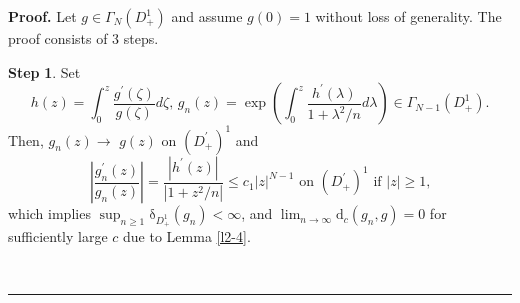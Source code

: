 \documentclass[a4paper]{article}%
\newenvironment{proof}[1][Proof]{\noindent\textbf{#1.} }{\ \rule{0.5em}{0.5em}}
\begin{document}
\begin{proof}
Let $g\in\Gamma_{N}\left(  D_{+}^{1}\right)  $ and assume $g(0)=1$ without
loss of generality. The proof consists of 3 steps.

\textbf{Step} \textbf{1}. Set%
\[
h\left(  z\right)  =%
{\displaystyle\int_{0}^{z}}
\dfrac{g^{\prime}\left(  \zeta\right)  }{g\left(  \zeta\right)  }d\zeta\text{,
\ }g_{n}\left(  z\right)  =\exp\left(  \int_{0}^{z}\dfrac{h^{\prime}\left(
\lambda\right)  }{1+\lambda^{2}/n}d\lambda\right)  \in\Gamma_{N-1}\left(
D_{+}^{1}\right)  \text{.}%
\]
Then, $g_{n}\left(  z\right)  \rightarrow$ $g\left(  z\right)  $ on $\left(
D_{+}^{\prime}\right)  ^{1}$ and%
\[
\left\vert \dfrac{g_{n}^{\prime}\left(  z\right)  }{g_{n}\left(  z\right)
}\right\vert =\dfrac{\left\vert h^{\prime}\left(  z\right)  \right\vert
}{\left\vert 1+z^{2}/n\right\vert }\leq c_{1}\left\vert z\right\vert
^{N-1}\text{ \ on }\left(  D_{+}^{\prime}\right)  ^{1}\text{ if }\left\vert
z\right\vert \geq1\text{,}%
\]
which implies $\sup_{n\geq1}\mathrm{\delta}_{D_{+}^{1}}\left(  g_{n}\right)
<\infty$, and $\lim_{n\rightarrow\infty}\mathrm{d}_{c}\left(  g_{n},g\right)
=0$ for sufficiently large $c$ due to Lemma \ref{l2-4}.


\end{proof}
\end{document}
